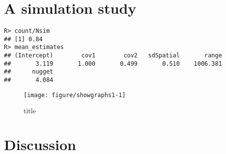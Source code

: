\documentclass{article}\usepackage[]{graphicx}\usepackage[]{color}
\makeatletter
\def\maxwidth{ %
  \ifdim\Gin@nat@width>\linewidth
    \linewidth
  \else
    \Gin@nat@width
  \fi
}
\newenvironment{kframe}{%
 \def\at@end@of@kframe{}%
 \ifinner\ifhmode%
  \def\at@end@of@kframe{\end{minipage}}%
  \begin{minipage}{\columnwidth}%
 \fi\fi%
 \def\FrameCommand##1{\hskip\@totalleftmargin \hskip-\fboxsep
 \colorbox{shadecolor}{##1}\hskip-\fboxsep
     \hskip-\linewidth \hskip-\@totalleftmargin \hskip\columnwidth}%
 \MakeFramed {\advance\hsize-\width
   \@totalleftmargin\z@ \linewidth\hsize
   \@setminipage}}%
 {\par\unskip\endMakeFramed%
 \at@end@of@kframe}
\newenvironment{knitrout}{}{} %
\makeatother
\begin{document}
\section{A simulation study}









\begin{knitrout}
\color{fgcolor}\begin{kframe}
\begin{verbatim}
R> count/Nsim
## [1] 0.84
R> mean_estimates
## (Intercept)        cov1        cov2   sdSpatial       range 
##       3.119       1.000       0.499       0.510    1006.381 
##      nugget 
##       4.084
\end{verbatim}
\end{kframe}
\end{knitrout}



\begin{knitrout}
\color{fgcolor}\begin{figure}

{\centering \texttt{[image: figure/showgraphs1-1]} 

}

\caption[title]{title}\label{fig:showgraphs1}
\end{figure}

\end{knitrout}





\section{Discussion}










  
  
\end{document}
